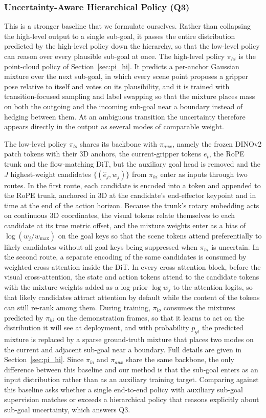 \documentclass[letterpaper, 10 pt, conference]{ieeeconf}  %
\begin{document}
\subsubsection{Uncertainty-Aware Hierarchical Policy (Q3)}
This is a stronger baseline that we formulate ourselves. Rather than collapsing the high-level output to a single sub-goal, it passes the entire distribution predicted by the high-level policy down the hierarchy, so that the low-level policy can reason over every plausible sub-goal at once. The high-level policy $\pi_{hi}$ is the point-cloud policy of Section~\ref{sec:pi_hi}. It predicts a per-anchor Gaussian mixture over the next sub-goal, in which every scene point proposes a gripper pose relative to itself and votes on its plausibility, and it is trained with transition-focused sampling and label swapping so that the mixture places mass on both the outgoing and the incoming sub-goal near a boundary instead of hedging between them. At an ambiguous transition the uncertainty therefore appears directly in the output as several modes of comparable weight.

The low-level policy $\pi_{lo}$ shares its backbone with $\pi_{aux}$, namely the frozen DINOv2 patch tokens with their 3D anchors, the current-gripper tokens $e_t$, the RoPE trunk and the flow-matching DiT, but the auxiliary goal head is removed and the $J$ highest-weight candidates $\{(\hat{e}_j, w_j)\}$ from $\pi_{hi}$ enter as inputs through two routes. In the first route, each candidate is encoded into a token and appended to the RoPE trunk, anchored in 3D at the candidate's end-effector keypoint and in time at the end of the action horizon. Because the trunk's rotary embedding acts on continuous 3D coordinates, the visual tokens relate themselves to each candidate at its true metric offset, and the mixture weights enter as a bias of $\log(w_j / w_{\max})$ on the goal keys so that the scene tokens attend preferentially to likely candidates without all goal keys being suppressed when $\pi_{hi}$ is uncertain. In the second route, a separate encoding of the same candidates is consumed by weighted cross-attention inside the DiT. In every cross-attention block, before the visual cross-attention, the state and action tokens attend to the candidate tokens with the mixture weights added as a log-prior $\log w_j$ to the attention logits, so that likely candidates attract attention by default while the content of the tokens can still re-rank among them. During training, $\pi_{lo}$ consumes the mixtures predicted by $\pi_{hi}$ on the demonstration frames, so that it learns to act on the distribution it will see at deployment, and with probability $p_{gt}$ the predicted mixture is replaced by a sparse ground-truth mixture that places two modes on the current and adjacent sub-goal near a boundary. Full details are given in Section~\ref{sec:pi_hi}. Since $\pi_{lo}$ and $\pi_{aux}$ share the same backbone, the only difference between this baseline and our method is that the sub-goal enters as an input distribution rather than as an auxiliary training target. Comparing against this baseline asks whether a single end-to-end policy with auxiliary sub-goal supervision matches or exceeds a hierarchical policy that reasons explicitly about sub-goal uncertainty, which answers Q3.
\end{document}
